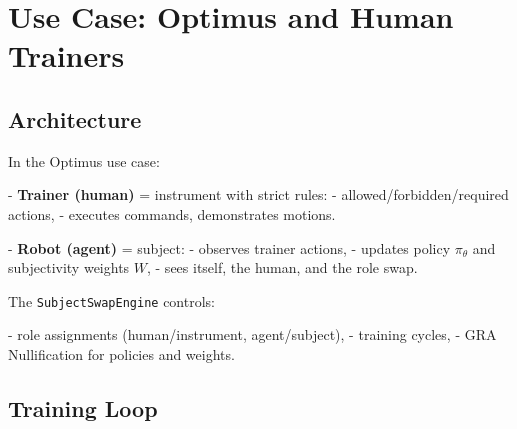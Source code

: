 \documentclass[11pt,a4paper]{article}
\begin{document}
\begin{algorithm}
\caption{SubjectSwapStep}
\begin{algorithmic}
\step
{}
\agg
{}
\agg
{}
\end{algorithmic}
\end{algorithm}

\section{Use Case: Optimus and Human Trainers}

\subsection{Architecture}

In the Optimus use case:

- \textbf{Trainer (human)} = instrument with strict rules:
  - allowed/forbidden/required actions,
  - executes commands, demonstrates motions.

- \textbf{Robot (agent)} = subject:
  - observes trainer actions,
  - updates policy \(\pi_\theta\) and subjectivity weights \(W\),
  - sees itself, the human, and the role swap.

The \texttt{SubjectSwapEngine} controls:

- role assignments (human/instrument, agent/subject),
- training cycles,
- GRA Nullification for policies and weights.

\subsection{Training Loop}
\end{document}
